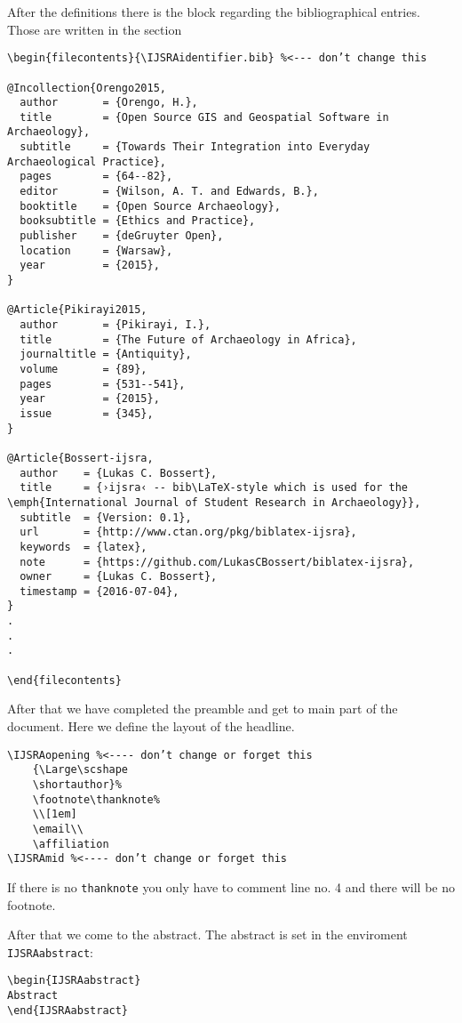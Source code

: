 \documentclass[
	]{ijsra}
\def\IJSRAidentifier{\currfilebase}
\def\shortauthor{Lukas C. Bossert}
\def\affiliation{Humboldt-Universität zu Berlin | Excellence-Cluster Topoi}
\def\thanknote{The coding of this documentclass is done at \href{https://github.com/LukasCBossert/documentclass-ijsra}{https://github.com/LukasCBossert/documentclass-ijsra} }
\begin{document}
After the definitions there is the block regarding the bibliographical entries.
Those are written in the section 
\begin{lstlisting}[label=bibliography,caption={Bibliographical information}]
\begin{filecontents}{\IJSRAidentifier.bib} %<--- don’t change this

@Incollection{Orengo2015,
  author       = {Orengo, H.},
  title        = {Open Source GIS and Geospatial Software in Archaeology},
  subtitle     = {Towards Their Integration into Everyday Archaeological Practice},
  pages        = {64--82},
  editor       = {Wilson, A. T. and Edwards, B.},
  booktitle    = {Open Source Archaeology},
  booksubtitle = {Ethics and Practice},
  publisher    = {deGruyter Open},
  location     = {Warsaw},
  year         = {2015},
}

@Article{Pikirayi2015,
  author       = {Pikirayi, I.},
  title        = {The Future of Archaeology in Africa},
  journaltitle = {Antiquity},
  volume       = {89},
  pages        = {531--541},
  year         = {2015},
  issue        = {345},
}

@Article{Bossert-ijsra,
  author    = {Lukas C. Bossert},
  title     = {›ijsra‹ -- bib\LaTeX-style which is used for the \emph{International Journal of Student Research in Archaeology}},
  subtitle  = {Version: 0.1},
  url       = {http://www.ctan.org/pkg/biblatex-ijsra},
  keywords  = {latex},
  note      = {https://github.com/LukasCBossert/biblatex-ijsra},
  owner     = {Lukas C. Bossert},
  timestamp = {2016-07-04},
}
.
.
.

\end{filecontents}
\end{lstlisting}

After that we have completed the preamble and get to main part of the document.
Here we define the layout of the headline.

\begin{lstlisting}[label=headline,caption={Headline layout}]
\IJSRAopening %<---- don’t change or forget this
	{\Large\scshape
	\shortauthor}%
	\footnote\thanknote% 
	\\[1em]
	\email\\
	\affiliation
\IJSRAmid %<---- don’t change or forget this
\end{lstlisting}
If there is no \texttt{thanknote} you only have to comment line no. 4 and there will be no footnote.

After that we come to the abstract. 
The abstract is set in the enviroment \texttt{IJSRAabstract}:
\begin{lstlisting}[label=abstract,caption={IJSRAabstract}]
\begin{IJSRAabstract}
Abstract
\end{IJSRAabstract}
\end{lstlisting}
\end{document}
